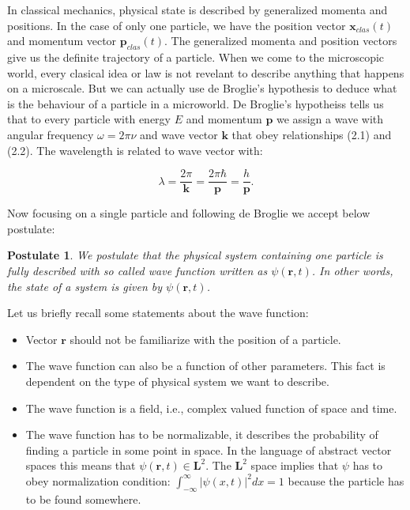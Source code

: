 \documentclass[a4paper,oneside,openright,11pt]{book}
\newtheorem{theorem}{Postulate}
\begin{document}
In classical mechanics, physical state is described by generalized momenta and positions. In the case of only one particle, we have the position vector $\textbf{x}_{clas}(t)$ and momentum vector  $\textbf{p}_{clas}(t)$. The generalized momenta and position vectors give us the definite trajectory of a particle. When we come to the microscopic world, every clasical idea or law is not revelant to describe anything that happens on a microscale. But we can actually use de Broglie's hypothesis to deduce what is the behaviour of a particle in a microworld. De Broglie's hypotheiss tells us that to every particle with energy $E$ and momentum $\textbf{p}$  we assign a wave with angular frequency $\omega = 2 \pi \nu$ and wave vector $\textbf{k}$ that obey relationships (2.1) and (2.2). The wavelength is related to wave vector with:

\begin{equation}
    \lambda = \frac{2 \pi}{\textbf{k}} = \frac{2 \pi \hbar}{\textbf{p}} = \frac{h}{\textbf{p}}.
\end{equation}

Now focusing on a single particle and following de Broglie we accept below postulate:

\begin{theorem}
We postulate that the physical system containing one particle is fully described with so called wave function written as $\psi(\textbf{r}, t)$. In other words, the state of a system is given by $\psi(\textbf{r}, t)$.
\end{theorem}

Let us briefly recall some statements about the wave function:


\begin{itemize}
    \item Vector $\textbf{r}$ should not be familiarize with the position of a particle.
    \item The wave function can also be a function of other parameters. This fact is dependent on the type of physical system we want to describe.
    \item The wave function is a field, i.e., complex valued function of space and time.
    \item The wave function has to be normalizable, it describes the probability of finding a particle in some point in space. In the language of abstract vector spaces this means that $\psi(\textbf{r}, t) \in \textbf{L}^{2}$\cite{L2}. The $\textbf{L}^{2}$ space implies that $\psi$ has to obey normalization condition: $\int_{-\infty}^{\infty} \lvert \psi(x, t) \rvert^{2}dx = 1$ because the particle has to be found somewhere.  
\end{itemize}
\end{document}
